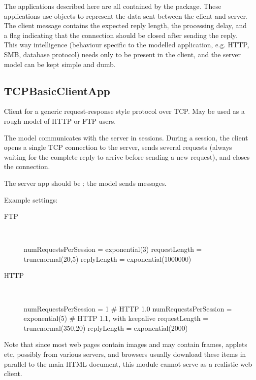 The applications described here are all contained by the
 package. These applications use
 objects to represent the data sent between the client
and server. The client message contains the expected reply length, the
processing delay, and a flag indicating that the connection should be closed
after sending the reply. This way intelligence (behaviour specific to the
modelled application, e.g. HTTP, SMB, database protocol) needs only to be
present in the client, and the server model can be kept simple and dumb.


\subsection{TCPBasicClientApp}

Client for a generic request-response style protocol over TCP.
May be used as a rough model of HTTP or FTP users.

The model communicates with the server in sessions. During a session,
the client opens a single TCP connection to the server, sends several
requests (always waiting for the complete reply to arrive before
sending a new request), and closes the connection.

The server app should be ; the model sends
 messages.

Example settings:

\begin{description}
\item[FTP] \quad \\

\begin{inifile}
numRequestsPerSession = exponential(3)
requestLength = truncnormal(20,5)
replyLength = exponential(1000000)
\end{inifile}

\item[HTTP] \quad \\

\begin{inifile}
numRequestsPerSession = 1 # HTTP 1.0
numRequestsPerSession = exponential(5)  # HTTP 1.1, with keepalive
requestLength = truncnormal(350,20)
replyLength = exponential(2000)
\end{inifile}

\end{description}

Note that since most web pages contain images and may contain frames,
applets etc, possibly from various servers, and browsers usually download
these items in parallel to the main HTML document, this module cannot
serve as a realistic web client.

